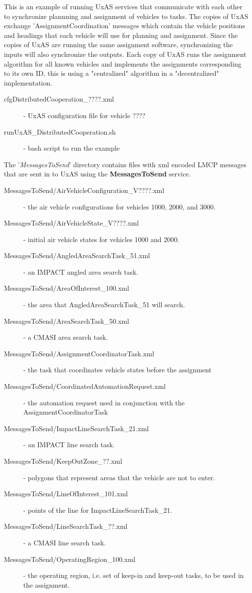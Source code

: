 This is an example of running UxAS services that communicate with each other to synchronize plannning and assignment of vehicles to tasks. The copies of UxAS exchange 'AssignmentCoordination' messages which contain the vehicle positions and headings that each vehicle will use for planning and assignment. Since the copies of UxAS are running the same assignment software, synchronizing the inputs will also synchronize the outputs. Each copy of UxAS runs the assignment algorithm for all known vehicles and implements the assignments corresponding to its own ID, this is using a "centralized" algorithm in a "decentralized" implementation.

\begin{description}
	\item[cfgDistributedCooperation\_????.xml] - UxAS configuration file for vehicle ???? 
	\item[runUxAS\_DistributedCooperation.sh] - bash script to run the example
\end{description}
 
The '\textit{MessagesToSend}' directory contains files with xml encoded LMCP messages that are sent in to UxAS using the \textbf{MessagesToSend} service. 

\begin{description}
	\item[MessagesToSend/AirVehicleConfiguration\_V????.xml] - the air vehicle configurations for vehicles 1000, 2000, and 3000.
	\item[MessagesToSend/AirVehicleState\_V????.xml] - initial air vehicle states for vehicles  1000 and 2000.
	\item[MessagesToSend/AngledAreaSearchTask\_51.xml] - an IMPACT angled area search task.
	\item[MessagesToSend/AreaOfInterest\_100.xml] - the area that AngledAreaSearchTask\_51 will search.
	\item[MessagesToSend/AreaSearchTask\_50.xml] - a CMASI area search task.
	\item[MessagesToSend/AssignmentCoordinatorTask.xml] - the task that coordinates vehicle states before the assignment
	\item[MessagesToSend/CoordinatedAutomationRequest.xml] - the automation request used in conjunction with the AssignmentCoordinatorTask
	\item[MessagesToSend/ImpactLineSearchTask\_21.xml] - an IMPACT line search task.
	\item[MessagesToSend/KeepOutZone\_??.xml] - polygons that represent areas that the vehicle are not to enter.
	\item[MessagesToSend/LineOfInterest\_101.xml] - points of the line for ImpactLineSearchTask\_21.
	\item[MessagesToSend/LineSearchTask\_??.xml] - a CMASI line search task.
	\item[MessagesToSend/OperatingRegion\_100.xml] - the operating region, i.e. set of keep-in and keep-out tasks, to be used in the assignment.
\end{description}




